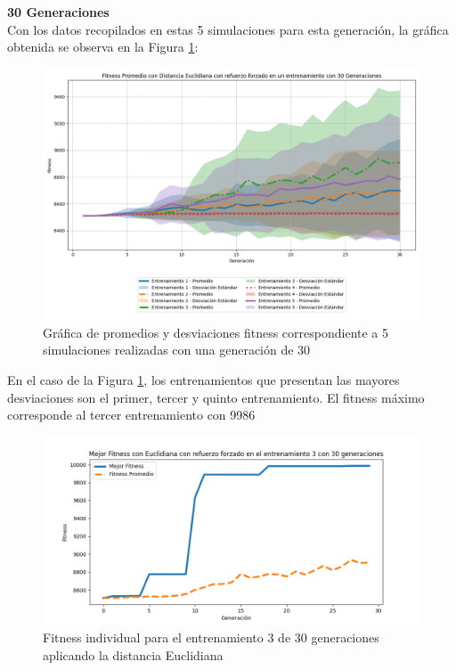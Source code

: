 \documentclass[conference]{IEEEtran}
\begin{document}
\textbf{30 Generaciones}\\
Con los datos recopilados en estas 5 simulaciones para esta generación, la gráfica obtenida se observa en la Figura \ref{fig:Euclidiana_30_refuerzo}:
\begin{figure}[H]
    \centering    \includegraphics[width=0.99 \linewidth]{Euclidiana/Fitness_Acumulado_Eucli_30Gen.png}
    \caption{Gráfica de promedios y desviaciones fitness correspondiente a 5 simulaciones realizadas con una generación de 30}
    \label{fig:Euclidiana_30_refuerzo}
\end{figure}
En el caso de la Figura \ref{fig:Euclidiana_30_refuerzo}, los entrenamientos que presentan las mayores desviaciones son el primer, tercer y quinto entrenamiento. El fitness máximo corresponde al tercer entrenamiento con 9986
\begin{figure}[H]
    \centering
    \includegraphics[width=0.9\linewidth]{Euclidiana/Fitness_individual_30/Fitness_3_Eucli_30Gen.png}
    \caption{Fitness individual para el entrenamiento 3 de 30 generaciones aplicando la distancia Euclidiana}
    \label{fig:Fitnes_ecu_3_30_inv}
\end{figure}
\end{document}
